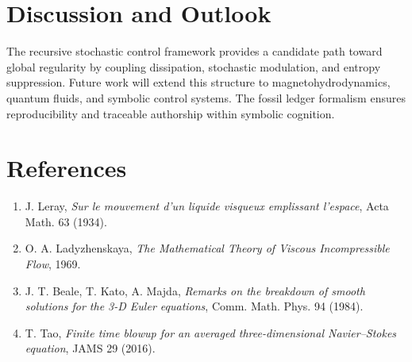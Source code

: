 \documentclass[11pt]{article}
\begin{document}
\section{Discussion and Outlook}
The recursive stochastic control framework provides a candidate path toward global regularity by coupling dissipation, stochastic modulation, and entropy suppression. Future work will extend this structure to magnetohydrodynamics, quantum fluids, and symbolic control systems. The fossil ledger formalism ensures reproducibility and traceable authorship within symbolic cognition.

\section*{References}
\begin{enumerate}
\item J. Leray, \emph{Sur le mouvement d'un liquide visqueux emplissant l'espace}, Acta Math. 63 (1934).
\item O. A. Ladyzhenskaya, \emph{The Mathematical Theory of Viscous Incompressible Flow}, 1969.
\item J. T. Beale, T. Kato, A. Majda, \emph{Remarks on the breakdown of smooth solutions for the 3-D Euler equations}, Comm. Math. Phys. 94 (1984).
\item T. Tao, \emph{Finite time blowup for an averaged three-dimensional Navier–Stokes equation}, JAMS 29 (2016).
\end{enumerate}
\end{document}
